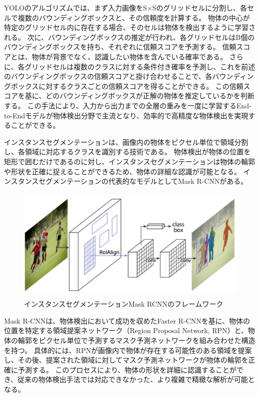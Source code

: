 YOLOのアルゴリズムでは、まず入力画像をS×Sのグリッドセルに分割し、各セルで複数のバウンディングボックスと、その信頼度を計算する。
物体の中心が特定のグリッドセル内に存在する場合、そのセルは物体を検出するように学習される。
次に、バウンディングボックスの推定が行われ、各グリッドセルはB個のバウンディングボックスを持ち、それぞれに信頼スコアを予測する。
信頼スコアとは、物体が背景でなく、認識したい物体を含んでいる確率である。
さらに、各グリッドセルは複数のクラスに対する条件付き確率を予測し、これを前述のバウンディングボックスの信頼スコアと掛け合わせることで、各バウンディングボックスに対するクラスごとの信頼スコアを得ることができる。
この信頼スコアを基に、どのバウンディングボックスが正解の物体を推定しているかを判断する。
この手法により、入力から出力までの全層の重みを一度に学習するEnd-to-Endモデルが物体検出分野で主流となり、効率的で高精度な物体検出を実現することができる。

インスタンスセグメンテーションは、画像内の物体をピクセル単位で領域分割し、各領域に対応するクラスを識別する技術である。
物体検出が物体の位置を矩形で囲むだけであるのに対し、インスタンスセグメンテーションは物体の輪郭や形状を正確に捉えることができるため、物体の詳細な認識が可能となる。
インスタンスセグメンテーションの代表的なモデルとしてMask R-CNNがある。
\begin{figure}[htbt]
	\centering
	 \includegraphics[height=55mm]{Figure/Mask-RCNN.eps}
	 \caption{インスタンスセグメンテーションMask RCNNのフレームワーク}
	 \label{fig:f5}
\end{figure}

Mask R-CNNは、物体検出において成功を収めたFaster R-CNNを基に、物体の位置を特定する領域提案ネットワーク（Region Proposal Network, RPN）と、物体の輪郭をピクセル単位で予測するマスク予測ネットワークを組み合わせた構造を持つ。
具体的には、RPNが画像内で物体が存在する可能性のある領域を提案し、その後、提案された領域に対してマスク予測ネットワークが物体の輪郭を正確に予測する。
このプロセスにより、物体の形状を詳細に認識することができ、従来の物体検出手法では対応できなかった、より複雑で精緻な解析が可能となる。

